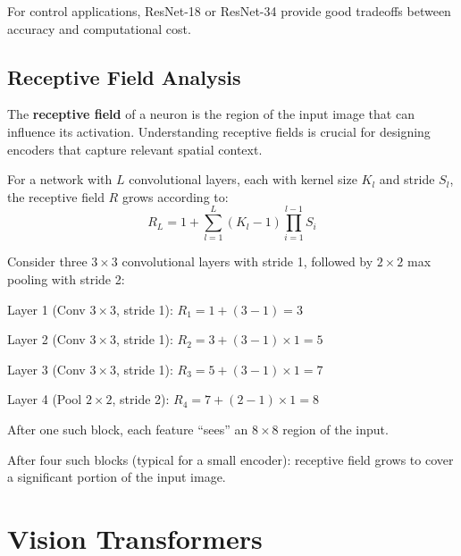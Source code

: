 For control applications, ResNet-18 or ResNet-34 provide good tradeoffs between accuracy and computational cost.

\subsection{Receptive Field Analysis}

The \textbf{receptive field} of a neuron is the region of the input image that can influence its activation. Understanding receptive fields is crucial for designing encoders that capture relevant spatial context.

For a network with $L$ convolutional layers, each with kernel size $K_l$ and stride $S_l$, the receptive field $R$ grows according to:
\begin{equation}
R_L = 1 + \sum_{l=1}^{L} (K_l - 1) \prod_{i=1}^{l-1} S_i
\label{eq:receptive_field}
\end{equation}

\begin{example}
Consider three $3 \times 3$ convolutional layers with stride 1, followed by $2 \times 2$ max pooling with stride 2:

Layer 1 (Conv $3 \times 3$, stride 1): $R_1 = 1 + (3-1) = 3$

Layer 2 (Conv $3 \times 3$, stride 1): $R_2 = 3 + (3-1) \times 1 = 5$

Layer 3 (Conv $3 \times 3$, stride 1): $R_3 = 5 + (3-1) \times 1 = 7$

Layer 4 (Pool $2 \times 2$, stride 2): $R_4 = 7 + (2-1) \times 1 = 8$

After one such block, each feature ``sees'' an $8 \times 8$ region of the input.

After four such blocks (typical for a small encoder): receptive field grows to cover a significant portion of the input image.
\end{example}


\section{Vision Transformers}
\label{sec:vision_transformers}

